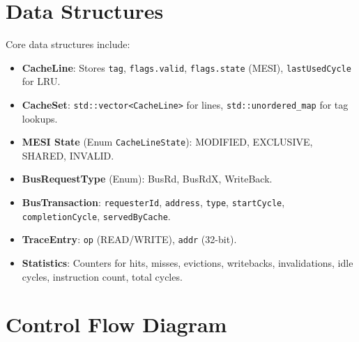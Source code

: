 \documentclass[11pt]{article}
\begin{document}
\section{Data Structures}

Core data structures include:
\begin{itemize}
    \item \textbf{CacheLine}: Stores \texttt{tag}, \texttt{flags.valid}, \texttt{flags.state} (MESI), \texttt{lastUsedCycle} for LRU.
    \item \textbf{CacheSet}: \texttt{std::vector<CacheLine>} for lines, \texttt{std::unordered_map} for tag lookups.
    \item \textbf{MESI State} (Enum \texttt{CacheLineState}): MODIFIED, EXCLUSIVE, SHARED, INVALID.
    \item \textbf{BusRequestType} (Enum): BusRd, BusRdX, WriteBack.
    \item \textbf{BusTransaction}: \texttt{requesterId}, \texttt{address}, \texttt{type}, \texttt{startCycle}, \texttt{completionCycle}, \texttt{servedByCache}.
    \item \textbf{TraceEntry}: \texttt{op} (READ/WRITE), \texttt{addr} (32-bit).
    \item \textbf{Statistics}: Counters for hits, misses, evictions, writebacks, invalidations, idle cycles, instruction count, total cycles.
\end{itemize}

\section{Control Flow Diagram}
\end{document}
